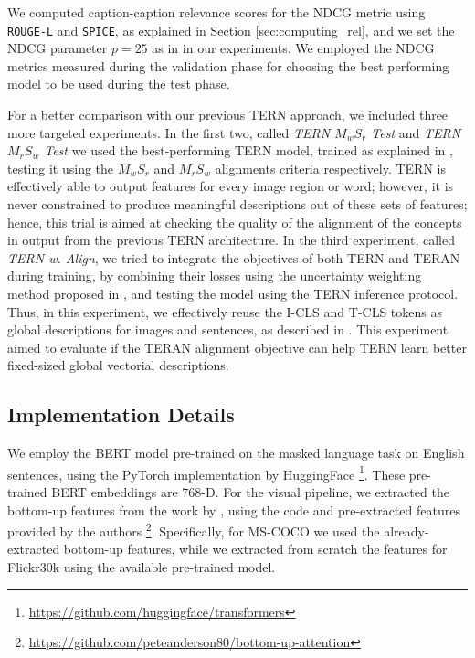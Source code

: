 \documentclass[acmsmall]{acmart}
\newif\ifdraft
\newcommand{\majorrevised}[1]{#1}
\newcommand{\revised}[1]{\ifdraft{\leavevmode\color{blue}{#1}}\else{#1}\fi}
\begin{document}
We computed caption-caption relevance scores for the NDCG metric using \texttt{ROUGE-L}\cite{lin-2004-rouge} and \texttt{SPICE}\cite{AndersonFJG16spice}, as explained in Section \ref{sec:computing_rel}, and we set the NDCG parameter $p = 25$ as in \cite{carrara2018pictureit} in our experiments.
We employed the NDCG metrics measured during the validation phase for choosing the best performing model to be used during the test phase.

\majorrevised{For a better comparison with our previous TERN approach, we included three more targeted experiments.}
In the first two, called \textit{TERN $M_{w}S_{r}$ Test} and \textit{TERN $M_{r}S_{w}$ Test} we used the best-performing TERN model, trained as explained in \cite{messina2020tern}, testing it using the $M_{w}S_{r}$ and $M_{r}S_{w}$ alignments criteria respectively. TERN is effectively able to output features for every image region or word; however, it is never constrained to produce meaningful descriptions out of these sets of features; hence, this trial is aimed at checking the quality of the alignment of the concepts in output from the previous TERN architecture. 
\majorrevised{In the third experiment, called \textit{TERN w. Align}, we tried to integrate the objectives of both TERN and TERAN during training, by combining their losses using the uncertainty weighting method proposed in \cite{kendall2018multi}, and testing the model using the TERN inference protocol. \revised{Thus, in this experiment, we effectively reuse the I-CLS and T-CLS tokens as global descriptions for images and sentences, as described in \cite{messina2020tern}}. This experiment aimed to evaluate if the TERAN alignment objective can help TERN learn better fixed-sized global vectorial descriptions.
}

\subsection{Implementation Details}
We employ the BERT model pre-trained on the masked language task on English sentences, using the PyTorch implementation by HuggingFace \footnote{\url{https://github.com/huggingface/transformers}}. These pre-trained BERT embeddings are 768-D.
For the visual pipeline, we extracted the bottom-up features from the work by \cite{Anderson2018bottomup}, using the code and pre-extracted features provided by the authors \footnote{\url{https://github.com/peteanderson80/bottom-up-attention}}. Specifically, for MS-COCO we used the already-extracted bottom-up features, while we extracted from scratch the features for Flickr30k using the available pre-trained model.
\end{document}
